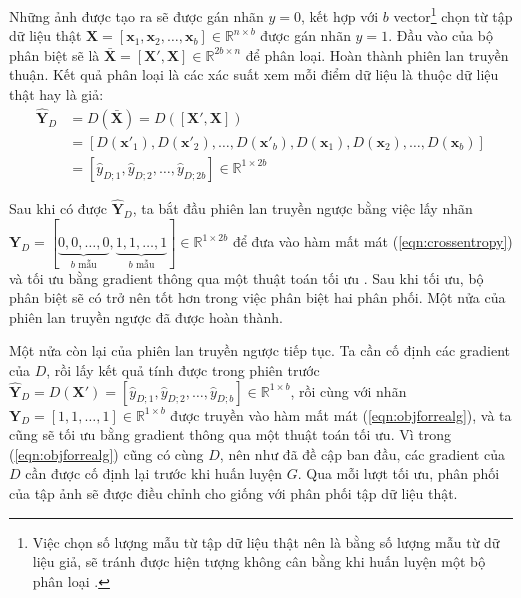 \documentclass[a4paper, 12pt]{report}
\begin{document}
Những ảnh được tạo ra sẽ được gán nhãn $y=0$, kết hợp với $b$ vector\footnote{Việc chọn số lượng mẫu từ tập dữ liệu thật nên là bằng số lượng mẫu từ dữ liệu giả, sẽ tránh được hiện tượng không cân bằng khi huấn luyện một bộ phân loại \cite{jasonimbalance2019}.} chọn từ tập dữ liệu thật $\mathbf{X} = \left[\mathbf{x}_1, \mathbf{x}_2, \dots, \mathbf{x}_b\right] \in \mathbb{R}^{n \times b}$ được gán nhãn $y=1$.
Đầu vào của bộ phân biệt sẽ là $\mathbf{\bar{X}} = \left[\mathbf{X'}, \mathbf{X}\right] \in \mathbb{R}^{2b \times n}$ để phân loại.
Hoàn thành phiên lan truyền thuận.
Kết quả phân loại là các xác suất xem mỗi điểm dữ liệu là thuộc dữ liệu thật hay là giả:
\begin{align}
    \widehat{\mathbf{Y}}_D &= D\left(\mathbf{\bar{X}}\right) = D\left(\left[\mathbf{X'}, \mathbf{X}\right]\right)\nonumber\\
                &= \left[D\left(\mathbf{x'}_1\right), D\left(\mathbf{x'}_2\right), \dots, D\left(\mathbf{x'}_b\right), D\left(\mathbf{x}_1\right), D\left(\mathbf{x}_2\right), \dots, D\left(\mathbf{x}_b\right)\right]\nonumber\\
                &= \left[\widehat{y}_{D; 1}, \widehat{y}_{D; 2}, \dots, \widehat{y}_{D; 2b}\right] \in \mathbb{R}^{1 \times 2b}
\end{align}

Sau khi có được $\widehat{\mathbf{Y}}_D$, ta bắt đầu phiên lan truyền ngược bằng việc lấy nhãn $\mathbf{Y}_D=[\underbrace{0, 0, \dots, 0}_{b \text{ mẫu}}, \underbrace{1, 1, \dots, 1}_{b \text{ mẫu}}] \in \mathbb{R}^{1 \times 2b}$ để đưa vào hàm mất mát (\ref{eqn:crossentropy}) và tối ưu bằng gradient thông qua một thuật toán tối ưu \cite{ruder2017overview}.
Sau khi tối ưu, bộ phân biệt sẽ có trở nên tốt hơn trong việc phân biệt hai phân phối.
Một nửa của phiên lan truyền ngược đã được hoàn thành.\vspace{5pt}

Một nửa còn lại của phiên lan truyền ngược tiếp tục.
Ta cần cố định các gradient của $D$, rồi lấy kết quả tính được trong phiên trước $\widehat{\mathbf{Y}}_D = D\left(\mathbf{X'}\right) = \left[\widehat{y}_{D; 1}, \widehat{y}_{D; 2}, \dots, \widehat{y}_{D; b}\right] \in \mathbb{R}^{1 \times b}$, rồi cùng với nhãn $\mathbf{Y}_D=\left[1, 1, \dots, 1\right] \in \mathbb{R}^{1 \times b}$ được truyền vào hàm mất mát (\ref{eqn:objforrealg}), và ta cũng sẽ tối ưu bằng gradient thông qua một thuật toán tối ưu.
Vì trong (\ref{eqn:objforrealg}) cũng có cùng $D$, nên như đã đề cập ban đầu, các gradient của $D$ cần được cố định lại trước khi huấn luyện $G$.
Qua mỗi lượt tối ưu, phân phối của tập ảnh sẽ được điều chỉnh cho giống với phân phối tập dữ liệu thật.\vspace{5pt}
\end{document}
